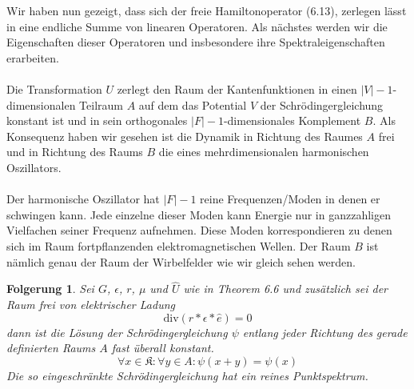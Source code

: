 \documentclass[11pt,a4paper,leqno]{report}
\newtheorem{corollary}[theorem]{Folgerung}
\numberwithin{equation}{chapter}
\begin{document}
\noindent
Wir haben nun gezeigt, dass sich der freie Hamiltonoperator (6.13), zerlegen l\"asst in eine endliche Summe von linearen Operatoren. Als n\"achstes werden wir die Eigenschaften dieser Operatoren und insbesondere ihre Spektraleigenschaften erarbeiten.
\\
\\
Die Transformation $U$ zerlegt den Raum der Kantenfunktionen in einen $|V| - 1$-dimensionalen Teilraum $A$ auf dem das Potential $V$ der Schr\"odingergleichung konstant ist und in sein orthogonales $|F| - 1$-dimensionales Komplement $B$. Als Konsequenz haben wir gesehen ist die Dynamik in Richtung des Raumes $A$ frei und in Richtung des Raums $B$ die eines mehrdimensionalen harmonischen Oszillators.\\
\\
Der harmonische Oszillator hat $|F| - 1$ reine Frequenzen/Moden in denen er schwingen kann. Jede einzelne dieser Moden kann Energie nur in ganzzahligen Vielfachen seiner Frequenz aufnehmen. Diese Moden korrespondieren zu denen sich im Raum fortpflanzenden elektromagnetischen Wellen. Der Raum $B$ ist n\"amlich genau der Raum der Wirbelfelder wie wir gleich sehen werden.
\begin{corollary}
	Sei $G$, $\epsilon$, $r$, $\mu$ und $\hat{U}$ wie in Theorem 6.6 und zus\"atzlich sei der Raum frei von elektrischer Ladung
	\begin{equation}
		\text{div}(r * \epsilon * \hat{e}) = 0
	\end{equation}
	dann ist die L\"osung der Schr\"odingergleichung $\psi$ entlang jeder Richtung des gerade definierten Raums $A$  fast \"uberall konstant.
	\begin{equation}
		\forall x\in \mathfrak{K}:\forall y\in A: \psi(x+y)=\psi(x)
	\end{equation}
	Die so eingeschr\"ankte Schr\"odingergleichung hat ein reines Punktspektrum.
\end{corollary} 
\end{document}
